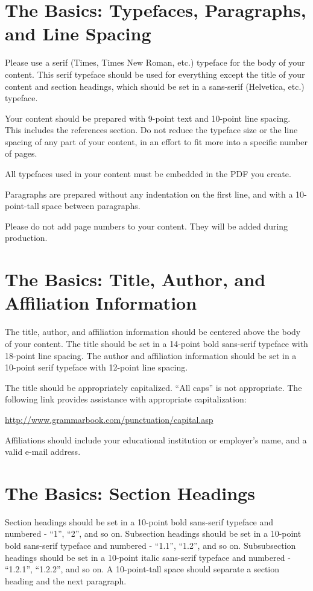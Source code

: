 \documentclass[tog]{acmsiggraph}
\begin{document}
\section{The Basics: Typefaces, Paragraphs, and Line Spacing}

Please use a serif (Times, Times New Roman, etc.) typeface for the
body of your content. This serif typeface should be used for
everything except the title of your content and section headings,
which should be set in a sans-serif (Helvetica, etc.) typeface.

Your content should be prepared with 9-point text and 10-point line
spacing. This includes the references section. Do not reduce the
typeface size or the line spacing of any part of your content, in an
effort to fit more into a specific number of pages. 

All typefaces used in your content must be embedded in the PDF you
create. 

Paragraphs are prepared without any indentation on the first line, and
with a 10-point-tall space between paragraphs.

Please do not add page numbers to your content. They will be added
during production.

\section{The Basics: Title, Author, and Affiliation Information}

The title, author, and affiliation information should be centered
above the body of your content. The title should be set in a 14-point
bold sans-serif typeface with 18-point line spacing. The author and
affiliation information should be set in a 10-point serif typeface
with 12-point line spacing.

The title should be appropriately capitalized. ``All caps'' is not
appropriate. The following link provides assistance with appropriate
capitalization:

{\small\url{http://www.grammarbook.com/punctuation/capital.asp}}

Affiliations should include your educational institution or employer's
name, and a valid e-mail address.

\section{The Basics: Section Headings}

Section headings should be set in a 10-point bold sans-serif typeface
and numbered - ``1'', ``2'', and so on. Subsection headings should be
set in a 10-point bold sans-serif typeface and numbered - ``1.1'',
``1.2'', and so on. Subsubsection headings should be set in a 10-point
italic sans-serif typeface and numbered - ``1.2.1'', ``1.2.2'', and so
on. A 10-point-tall space should separate a section heading and the
next paragraph.
\end{document}
